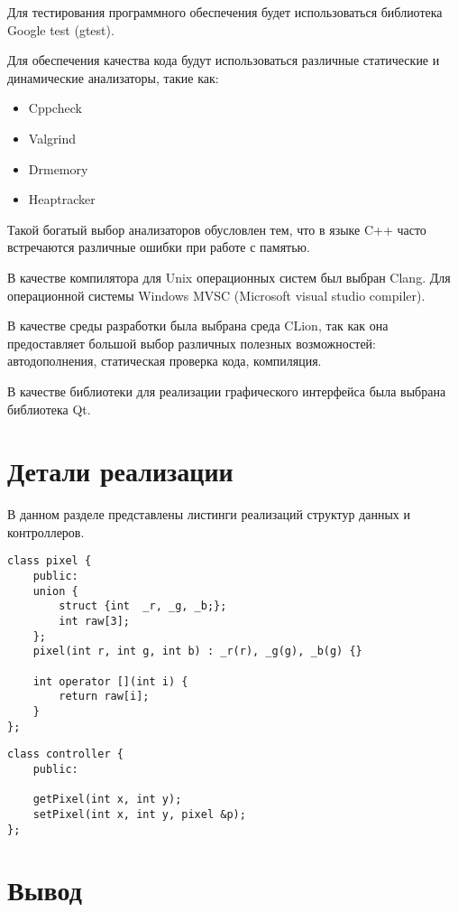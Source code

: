 \documentclass[a4paper,14pt, unknownkeysallowed]{extreport}
\begin{document}
    Для тестирования программного обеспечения будет использоваться библиотека Google test (gtest).

    Для обеспечения качества кода будут использоваться различные статические и динамические анализаторы, такие как:
    \begin{itemize}
        \item Cppcheck
        \item Valgrind
        \item Drmemory
        \item Heaptracker
    \end{itemize}

    Такой богатый выбор анализаторов обусловлен тем, что в языке C++ часто встречаются различные ошибки при работе с памятью.

    В качестве компилятора для Unix операционных систем был выбран Clang. Для операционной системы Windows MVSC (Microsoft visual studio compiler).

    В качестве среды разработки была выбрана среда CLion, так как она предоставляет большой выбор различных полезных возможностей: автодополнения, статическая проверка кода, компиляция.

    В качестве библиотеки для реализации графического интерфейса была выбрана библиотека Qt.

    \section{Детали реализации}

    В данном разделе представлены листинги реализаций структур данных и контроллеров.

    \begin{lstlisting}[caption=Структура пикселя]
class pixel {
    public:
    union {
        struct {int  _r, _g, _b;};
        int raw[3];
    };
    pixel(int r, int g, int b) : _r(r), _g(g), _b(g) {}

    int operator [](int i) {
        return raw[i];
    }
};
    \end{lstlisting}

    \begin{lstlisting}[caption=Контроллер корректировки изображения]
class controller {
    public:
    
    getPixel(int x, int y);
    setPixel(int x, int y, pixel &p);
};
    \end{lstlisting}

    \section*{Вывод}
\end{document}
